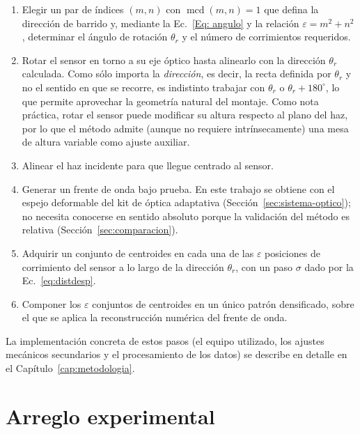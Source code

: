 \documentclass[letterpaper,12pt,oneside]{book}
\DeclareMathOperator{\mcd}{mcd} %
\begin{document}
\begin{enumerate}
	\item Elegir un par de índices $(m,n)$ con $\mcd(m,n)=1$ que defina la dirección de barrido y, mediante la Ec.~\ref{Eq: angulo} y la relación $\varepsilon = m^2+n^2$, determinar el ángulo de rotación $\theta_r$ y el número de corrimientos requeridos.

	\item Rotar el sensor en torno a su eje óptico hasta alinearlo con la dirección $\theta_r$ calculada. Como sólo importa la \emph{dirección}, es decir, la recta definida por $\theta_r$ y no el sentido en que se recorre, es indistinto trabajar con $\theta_r$ o $\theta_r+180^\circ$, lo que permite aprovechar la geometría natural del montaje. Como nota práctica, rotar el sensor puede modificar su altura respecto al plano del haz, por lo que el método admite (aunque no requiere intrínsecamente) una mesa de altura variable como ajuste auxiliar.

	\item Alinear el haz incidente para que llegue centrado al sensor.

	\item Generar un frente de onda bajo prueba. En este trabajo se obtiene con el espejo deformable del kit de óptica adaptativa (Sección~\ref{sec:sistema-optico}); no necesita conocerse en sentido absoluto porque la validación del método es relativa (Sección~\ref{sec:comparacion}).

	\item Adquirir un conjunto de centroides en cada una de las $\varepsilon$ posiciones de corrimiento del sensor a lo largo de la dirección $\theta_r$, con un paso $\sigma$ dado por la Ec.~\ref{eq:distdesp}.

	\item Componer los $\varepsilon$ conjuntos de centroides en un único patrón densificado, sobre el que se aplica la reconstrucción numérica del frente de onda.
\end{enumerate}

La implementación concreta de estos pasos (el equipo utilizado, los ajustes mecánicos
secundarios y el procesamiento de los datos) se describe en detalle en el
Capítulo~\ref{cap:metodologia}.








\chapter{Arreglo experimental}
\end{document}
